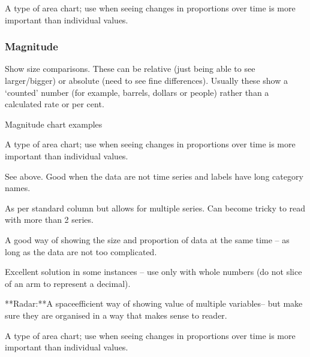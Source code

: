\documentclass[letterpaper,10pt,english]{jupyterBook}
\begin{document}
\sphinxAtStartPar
{} A type of area chart; use when seeing changes in proportions over time is more important than individual values.


\subsubsection{Magnitude}
\label{\detokenize{part1/communication:magnitude}}
\sphinxAtStartPar
Show size comparisons. These can be relative (just being able to see larger/bigger) or absolute (need to see fine differences). Usually these show a ‘counted’ number (for example, barrels, dollars or people) rather than a calculated rate or per cent.

\sphinxAtStartPar
{}

\sphinxAtStartPar
Magnitude chart examples

\sphinxAtStartPar
{} A type of area chart; use when seeing changes in proportions over time is more important than individual values.

\sphinxAtStartPar
{} See above. Good when the data are not time series and labels have long category names.

\sphinxAtStartPar
{} As per standard column but allows for multiple series. Can become tricky to read with more than 2 series.

\sphinxAtStartPar
{} A good way of showing the size and proportion of data at the same time – as long as the data are not too complicated.

\sphinxAtStartPar
{} Excellent solution in some instances – use only with whole numbers (do not slice of an arm to represent a decimal).

\sphinxAtStartPar
{}**Radar:**A space\sphinxhyphen{}efficient way of showing value of multiple variables– but make sure they are organised in a way  that makes sense to reader.

\sphinxAtStartPar
{} A type of area chart; use when seeing changes in proportions over time is more important than individual values.
\end{document}
